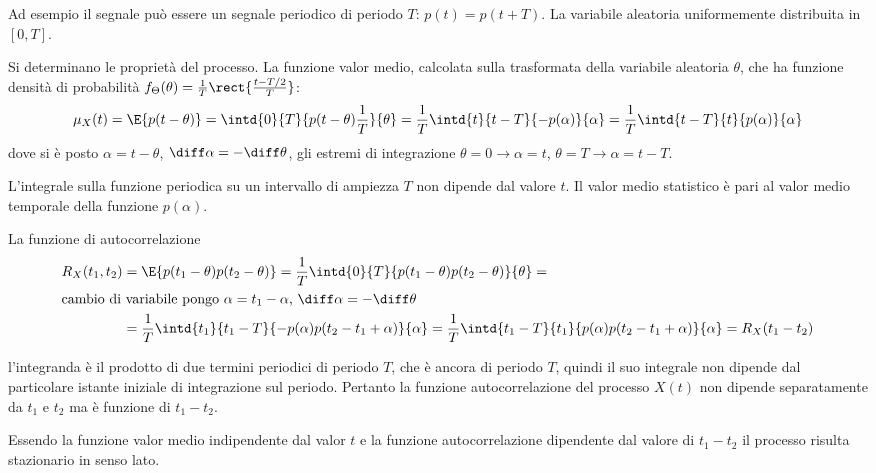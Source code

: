 Ad esempio il segnale può essere un segnale periodico di periodo $T$: $p(t)=p(t+T)$. La variabile aleatoria uniformemente distribuita in $[0,T]$.

Si determinano le proprietà del processo. La funzione valor medio, calcolata sulla trasformata della variabile aleatoria $\theta$, che ha funzione densità di probabilità $f_\Theta(\theta)=\frac{1}{T}\rect{\frac{t-T/2}{T}}$:
\[
	\mu_X(t)=\E{p(t-\theta)}=\intd{0}{T}{p(t-\theta)\frac{1}{T}}{\theta}=\frac{1}{T}\intd{t}{t-T}{-p(\alpha)}{\alpha}=\frac{1}{T}\intd{t-T}{t}{p(\alpha)}{\alpha}
\]
dove si è posto $\alpha=t-\theta$, $\diff\alpha=-\diff\theta$, gli estremi di integrazione $\theta=0\to\alpha=t$, $\theta=T\to\alpha=t-T$.

L'integrale sulla funzione periodica su un intervallo di ampiezza $T$ non dipende dal valore $t$. Il valor medio statistico è pari al valor medio temporale della funzione $p(\alpha)$.

La funzione di autocorrelazione
\begin{align*}
	R_X(t_1,t_2)&=\E{p(t_1-\theta)p(t_2-\theta)}=\frac{1}{T}\intd{0}{T}{p(t_1-\theta)p(t_2-\theta)}{\theta}=\\
\intertext{cambio di variabile pongo $\alpha=t_1-\alpha$, $\diff\alpha=-\diff\theta$}
	&=\frac{1}{T}\intd{t_1}{t_1-T}{-p(\alpha)p(t_2-t_1+\alpha)}{\alpha}=\frac{1}{T}\intd{t_1-T}{t_1}{p(\alpha)p(t_2-t_1+\alpha)}{\alpha}=R_X(t_1-t_2)
\end{align*}

l'integranda è il prodotto di due termini periodici di periodo $T$, che è ancora di periodo $T$, quindi il suo integrale non dipende dal particolare istante iniziale di integrazione sul periodo. Pertanto la funzione autocorrelazione del processo $X(t)$ non dipende separatamente da $t_1$ e $t_2$ ma è funzione di $t_1-t_2$.

Essendo la funzione valor medio indipendente dal valor $t$ e la funzione autocorrelazione dipendente dal valore di $t_1-t_2$ il processo risulta stazionario in senso lato.

